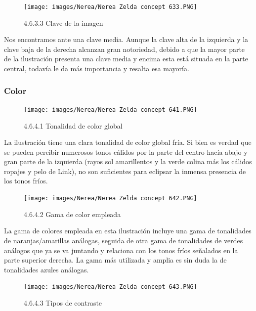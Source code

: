 \documentclass[12pt]{article}
\begin{document}
    \begin{figure}[H]
      \centering
      \texttt{[image: images/Nerea/Nerea Zelda concept 633.PNG]}
      \caption{\small 4.6.3.3 Clave de la imagen}
    \end{figure}

    Nos encontramos ante una clave media. Aunque la clave alta de la izquierda y la clave baja de la derecha alcanzan gran notoriedad, debido a que la mayor parte de la ilustración presenta una clave media y encima esta está situada en la parte central, todavía le da más importancia y resalta esa mayoría.


        \subsubsection{Color}


    \begin{figure}[H]
      \centering
      \texttt{[image: images/Nerea/Nerea Zelda concept 641.PNG]}
      \caption{\small 4.6.4.1 Tonalidad de color global}
    \end{figure}

    La ilustración tiene una clara tonalidad de color global fría. Si bien es verdad que se pueden percibir numerosos tonos cálidos por la parte del centro hacía abajo y gran parte de la izquierda (rayos sol amarillentos y la verde colina más los cálidos ropajes y pelo de Link), no son suficientes para eclipsar la inmensa presencia de los tonos fríos.

    \begin{figure}[H]
      \centering
      \texttt{[image: images/Nerea/Nerea Zelda concept 642.PNG]}
      \caption{\small 4.6.4.2 Gama de color empleada}
    \end{figure}

    La gama de colores empleada en esta ilustración incluye una gama de tonalidades de naranjas/amarillas análogas, seguida de otra gama de tonalidades de verdes análogos que ya se va juntando y relaciona con los tonos fríos señalados en la parte superior derecha. La gama más utilizada y amplia es sin duda la de tonalidades azules análogas.

    \begin{figure}[H]
      \centering
      \texttt{[image: images/Nerea/Nerea Zelda concept 643.PNG]}
      \caption{\small 4.6.4.3 Tipos de contraste}
    \end{figure}
\end{document}
